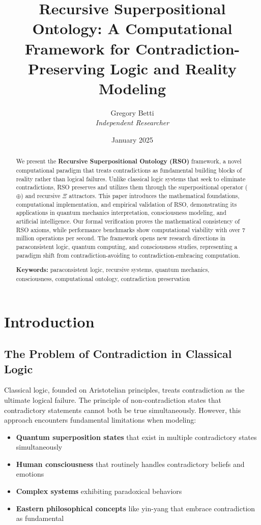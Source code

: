 \documentclass[11pt,a4paper]{article}
\title{\textbf{Recursive Superpositional Ontology: A Computational Framework for Contradiction-Preserving Logic and Reality Modeling}}
\author{
    Gregory Betti\\
    \textit{Independent Researcher}\\
}
\date{January 2025}
\begin{document}
\maketitle

\begin{abstract}
We present the \textbf{Recursive Superpositional Ontology (RSO)} framework, a novel computational paradigm that treats contradictions as fundamental building blocks of reality rather than logical failures. Unlike classical logic systems that seek to eliminate contradictions, RSO preserves and utilizes them through the superpositional operator ($\oplus$) and recursive $\Xi$ attractors. This paper introduces the mathematical foundations, computational implementation, and empirical validation of RSO, demonstrating its applications in quantum mechanics interpretation, consciousness modeling, and artificial intelligence. Our formal verification proves the mathematical consistency of RSO axioms, while performance benchmarks show computational viability with over 7 million operations per second. The framework opens new research directions in paraconsistent logic, quantum computing, and consciousness studies, representing a paradigm shift from contradiction-avoiding to contradiction-embracing computation.

\textbf{Keywords:} paraconsistent logic, recursive systems, quantum mechanics, consciousness, computational ontology, contradiction preservation
\end{abstract}

\section{Introduction}

\subsection{The Problem of Contradiction in Classical Logic}

Classical logic, founded on Aristotelian principles, treats contradiction as the ultimate logical failure. The principle of non-contradiction states that contradictory statements cannot both be true simultaneously. However, this approach encounters fundamental limitations when modeling:

\begin{itemize}
    \item \textbf{Quantum superposition states} that exist in multiple contradictory states simultaneously
    \item \textbf{Human consciousness} that routinely handles contradictory beliefs and emotions
    \item \textbf{Complex systems} exhibiting paradoxical behaviors
    \item \textbf{Eastern philosophical concepts} like yin-yang that embrace contradiction as fundamental
\end{itemize}
\end{document}
